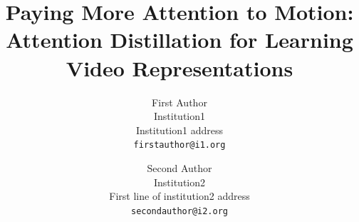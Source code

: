 \documentclass[10pt,twocolumn,letterpaper]{article}
\begin{document}
\title{Paying More Attention to Motion: \\ Attention Distillation for Learning Video Representations}

\author{First Author\\
Institution1\\
Institution1 address\\
{\tt\small firstauthor@i1.org}
\and
Second Author\\
Institution2\\
First line of institution2 address\\
{\tt\small secondauthor@i2.org}
}

\maketitle
\end{document}
